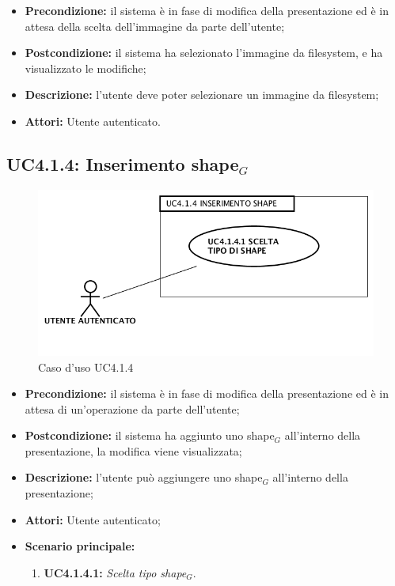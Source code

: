 \begin{itemize}
	\item \textbf{Precondizione:} il sistema è in fase di modifica della presentazione ed è in attesa della scelta dell'immagine da parte dell'utente;
	\item \textbf{Postcondizione:} il sistema ha selezionato l'immagine da filesystem, e ha visualizzato le modifiche;
	\item \textbf{Descrizione:} l'utente deve poter selezionare un immagine da filesystem;
	\item \textbf{Attori:} Utente autenticato.
\end{itemize}
\subsection{ UC4.1.4: Inserimento shape$_G$}

\begin{figure}[h]
	\begin{center}
	\includegraphics[scale=0.4]{diagram/UC4-1-4.png}
	\caption{Caso d'uso UC4.1.4}
	\end{center}
\end{figure}
\begin{itemize}
	\item \textbf{Precondizione:} il sistema è in fase di modifica della presentazione ed è in attesa di un'operazione da parte dell'utente;
	\item \textbf{Postcondizione:} il sistema ha aggiunto uno shape$_G$ all'interno della presentazione, la modifica viene visualizzata;
	\item \textbf{Descrizione:} l'utente può aggiungere uno shape$_G$ all'interno della presentazione;
	\item \textbf{Attori:} Utente autenticato;
	\item \textbf{Scenario principale:}
	\begin{enumerate}
		\item \textbf{ UC4.1.4.1:} \textit{ Scelta tipo shape$_G$}.
	\end{enumerate}
\end{itemize}
